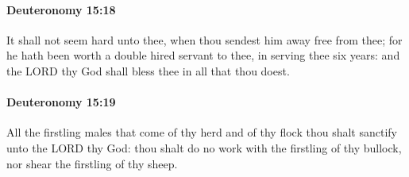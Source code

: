 		\paragraph{Deuteronomy 15:18} %
			\label{DEUTERONOMY-15-18}

			It shall not seem hard unto thee, when thou sendest him away free from thee; for he hath been worth a double hired servant to thee, in serving thee six years: and the LORD thy God shall bless thee in all that thou doest.


		\paragraph{Deuteronomy 15:19} %
			\label{DEUTERONOMY-15-19}

			All the firstling males that come of thy herd and of thy flock thou shalt sanctify unto the LORD thy God: thou shalt do no work with the firstling of thy bullock, nor shear the firstling of thy sheep.

